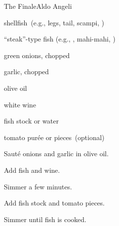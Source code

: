 \begin{recipe}{The Finale}{Aldo Angeli}{}

\begin{ingredients}
\item shellfish~(e.g.,  legs,  tail, scampi, )
\item ``steak''-type fish (e.g., , mahi-mahi, )
\item green onions, chopped
\item garlic, chopped
\item olive oil
\item \C{\half} white wine
\item \C{\half} fish stock or water
\item tomato pur\'ee or pieces~(optional)
\end{ingredients}

\begin{directions}
\item Saut\'e onions and garlic in olive oil.
\item Add fish and wine.
\item Simmer a few minutes.
\item Add fish stock and tomato pieces.
\item Simmer until fish is cooked.
\end{directions}

\end{recipe}
